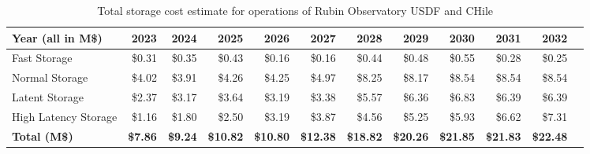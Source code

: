 \tiny \begin{longtable} { |p{}  |r  |r  |r  |r  |r  |r  |r  |r  |r  |r  |r |} 
\caption{Total storage cost estimate for operations of Rubin Observatory USDF and CHile \label{tab:opsStorageCost}}\\ 
\hline 
\textbf{Year (all in M\$)}&\textbf{2023}&\textbf{2024}&\textbf{2025}&\textbf{2026}&\textbf{2027}&\textbf{2028}&\textbf{2029}&\textbf{2030}&\textbf{2031}&\textbf{2032} \\ \hline
{Fast Storage}&{\$0.31}&{\$0.35}&{\$0.43}&{\$0.16}&{\$0.16}&{\$0.44}&{\$0.48}&{\$0.55}&{\$0.28}&{\$0.25} \\ \hline
{Normal Storage}&{\$4.02}&{\$3.91}&{\$4.26}&{\$4.25}&{\$4.97}&{\$8.25}&{\$8.17}&{\$8.54}&{\$8.54}&{\$8.54} \\ \hline
{Latent Storage}&{\$2.37}&{\$3.17}&{\$3.64}&{\$3.19}&{\$3.38}&{\$5.57}&{\$6.36}&{\$6.83}&{\$6.39}&{\$6.39} \\ \hline
{High Latency Storage}&{\$1.16}&{\$1.80}&{\$2.50}&{\$3.19}&{\$3.87}&{\$4.56}&{\$5.25}&{\$5.93}&{\$6.62}&{\$7.31} \\ \hline
\textbf{Total (M\$)}&\textbf{\$7.86}&\textbf{\$9.24}&\textbf{\$10.82}&\textbf{\$10.80}&\textbf{\$12.38}&\textbf{\$18.82}&\textbf{\$20.26}&\textbf{\$21.85}&\textbf{\$21.83}&\textbf{\$22.48} \\ \hline
\end{longtable} \normalsize
